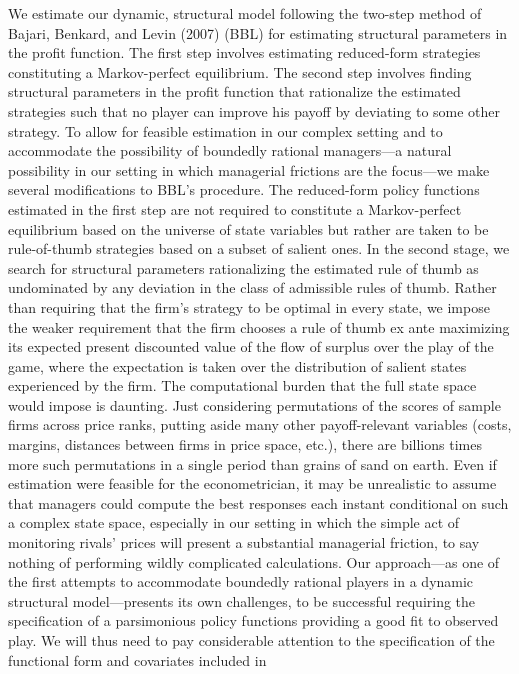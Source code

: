 \documentclass[11pt]{article}
\begin{document}
\begin{spacing}{1.3}
We estimate our dynamic, structural model following the two-step
method of Bajari, Benkard, and Levin (2007) (BBL) for estimating
structural parameters in the profit function. The first step involves
estimating reduced-form strategies constituting a Markov-perfect
equilibrium. The second step involves finding structural parameters in
the profit function that rationalize the estimated strategies such
that no player can improve his payoff by deviating to some other
strategy. To allow for feasible estimation in our complex setting and
to accommodate the possibility of boundedly rational managers---a
natural possibility in our setting in which managerial frictions are
the focus---we make several modifications to BBL's procedure.  The
reduced-form policy functions estimated in the first step are not
required to constitute a Markov-perfect equilibrium based on the
universe of state variables but rather are taken to be rule-of-thumb
strategies based on a subset of salient ones. In the second stage, we
search for structural parameters rationalizing the estimated rule of
thumb as undominated by any deviation in the class of admissible rules
of thumb. Rather than requiring that the firm's strategy to be optimal
in every state, we impose the weaker requirement that the firm chooses
a rule of thumb ex ante maximizing its expected present discounted
value of the flow of surplus over the play of the game, where the
expectation is taken over the distribution of salient states
experienced by the firm.  The computational burden that the full state
space would impose is daunting. Just considering permutations of the
scores of sample firms across price ranks, putting aside many other
payoff-relevant variables (costs, margins, distances between firms in
price space, etc.), there are billions times more such permutations in
a single period than grains of sand on earth.  Even if estimation were
feasible for the econometrician, it may be unrealistic to assume that
managers could compute the best responses each instant conditional on
such a complex state space, especially in our setting in which the
simple act of monitoring rivals' prices will present a substantial
managerial friction, to say nothing of performing wildly complicated
calculations.  Our approach---as one of the first attempts to
accommodate boundedly rational players in a dynamic structural
model---presents its own challenges, to be successful requiring the
specification of a parsimonious policy functions providing a good fit
to observed play. We will thus need to pay considerable attention to
the specification of the functional form and covariates included in

\end{spacing}
\end{document}
